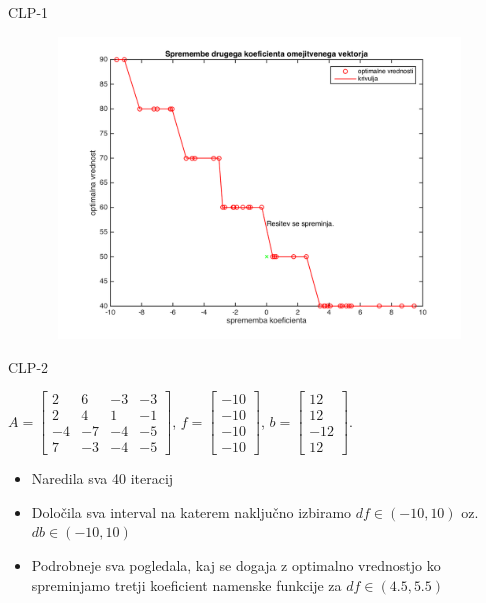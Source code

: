 \documentclass[t]{beamer}
\begin{document}
\begin{frame}{CLP-1}
\begin{figure}[h]
\includegraphics[width=11.2cm,height=8cm]{spremembe_b2.png}
\end{figure}
\end{frame}

\begin{frame}{CLP-2}
\begin{center}
$ A = \begin{bmatrix}
  2 & 6 & -3 & -3 \\
  2 & 4 & 1 & -1 \\
  -4 & -7 & -4 & -5 \\
   7 & -3 & -4 & -5  
\end{bmatrix} $, $f=\begin{bmatrix} -10 \\-10 \\-10\\ -10 \end{bmatrix}$, $b=\begin{bmatrix} 12 \\12 \\-12\\12 \end{bmatrix}.$
\end{center}
\begin{itemize}
\item Naredila sva 40 iteracij
\item Določila sva interval na katerem naključno izbiramo $df \in (-10,10)$ oz. $db \in (-10,10)$
\item Podrobneje sva pogledala, kaj se dogaja z optimalno vrednostjo ko spreminjamo tretji koeficient namenske funkcije za $df \in (4.5,5.5)$ 
\end{itemize}
\end{frame}
\end{document}
